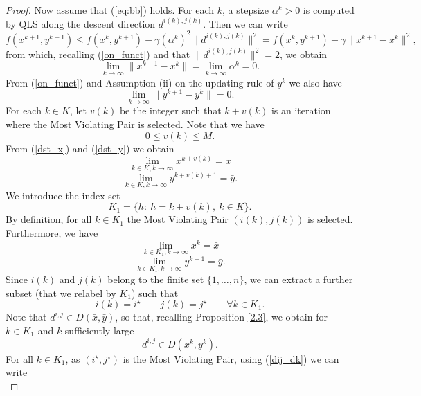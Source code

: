 \begin{proof}
Now assume that (\ref{eq:bb}) holds.
For each $k$, a stepsize $\alpha^k>0$ is computed by QLS along the descent direction $d^{i(k),j(k)}$.
Then we can write
\begin{equation}\label{red_funct}
 f(x^{k+1},y^{k+1})\le f(x^k,y^{k+1})-\gamma (\alpha^k)^2\|d^{i(k),j(k)}\|^2=f(x^k,y^{k+1})-\gamma\|x^{k+1}-x^k\|^2,
\end{equation}
from which, recalling (\ref{on_funct}) and that $\|d^{i(k),j(k)}\|^2=2$, we obtain
\begin{equation}\label{dst_x}
 \lim_{k\to\infty}\|x^{k+1}-x^k\|=\lim_{k\to\infty}\alpha^k=0.
\end{equation} 
From (\ref{on_funct}) and Assumption (ii) on the updating rule of $y^k$ we also have
\begin{equation}\label{dst_y}
 \lim_{k\to\infty}\|y^{k+1}-y^k\|=0.
\end{equation}
For each $k\in K$, let $v(k)$ be the integer such that $k+v(k)$ is an iteration
where the Most Violating Pair is selected. Note that we have
$$
0\le v(k) \le M.
$$
From (\ref{dst_x}) and (\ref{dst_y}) we obtain
\begin{equation}\label{cnv_x}
 \lim_{k\in K,k\to\infty}x^{k+v(k)}=\bar x
\end{equation}
\begin{equation}\label{cnv_y}
 \lim_{k\in K,k\to\infty}y^{k+v(k)+1}=\bar y.
\end{equation}
We introduce the index set 
$$
K_1=\{h: \ h=k+v(k), \ k\in K\}.
$$
By definition, for all $k\in K_1$ the Most Violating Pair $(i(k),j(k))$ is selected. Furthermore, we have
\begin{equation}\label{cnv2_x}
 \lim_{k\in K_1,k\to\infty}x^{k}=\bar x
\end{equation}
\begin{equation}\label{cnv2_y}
 \lim_{k\in K_1,k\to\infty}y^{k+1}=\bar y.
\end{equation}
Since $i(k)$ and $j(k)$ belong to the finite set $\{1,\ldots ,n\}$, we can extract a further subset (that we relabel by $K_1$) such that
$$
i(k)=i^\star \quad\quad j(k)=j^\star\quad\quad \forall k\in K_1.
$$
Note that $d^{i,j}\in D(\bar x,\bar y)$, so that, recalling Proposition \ref{2.3}, we obtain for
$k\in K_1$ and $k$ sufficiently large
\begin{equation}\label{dij_dk}
 d^{i,j}\in D(x^k,y^k).
\end{equation}
For all $k\in K_1$, as $(i^\star,j^\star)$ is the Most Violating Pair, using (\ref{dij_dk}) we can write
\begin{equation}\label{mvp_ij}

\end{equation}
\end{proof}
